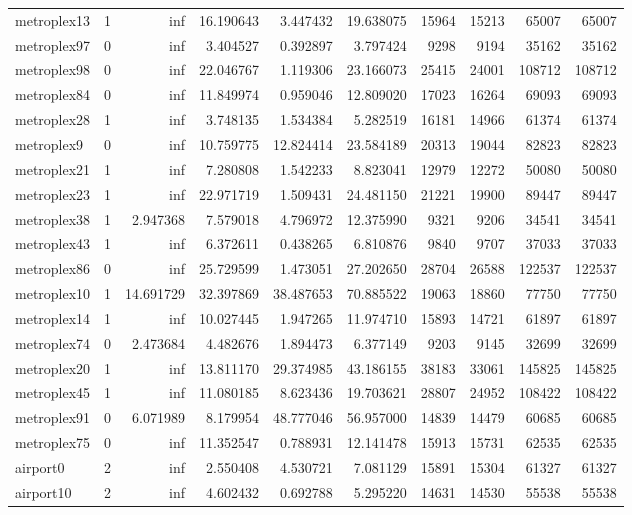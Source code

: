 \begin{longtable}{|l|r|r|r|r|r|r|r|r|r|}
metroplex13 & 1 & inf & 16.190643 & 3.447432 & 19.638075 & 15964 & 15213 & 65007 & 65007 \\
metroplex97 & 0 & inf & 3.404527 & 0.392897 & 3.797424 & 9298 & 9194 & 35162 & 35162 \\
metroplex98 & 0 & inf & 22.046767 & 1.119306 & 23.166073 & 25415 & 24001 & 108712 & 108712 \\
metroplex84 & 0 & inf & 11.849974 & 0.959046 & 12.809020 & 17023 & 16264 & 69093 & 69093 \\
metroplex28 & 1 & inf & 3.748135 & 1.534384 & 5.282519 & 16181 & 14966 & 61374 & 61374 \\
metroplex9 & 0 & inf & 10.759775 & 12.824414 & 23.584189 & 20313 & 19044 & 82823 & 82823 \\
metroplex21 & 1 & inf & 7.280808 & 1.542233 & 8.823041 & 12979 & 12272 & 50080 & 50080 \\
metroplex23 & 1 & inf & 22.971719 & 1.509431 & 24.481150 & 21221 & 19900 & 89447 & 89447 \\
metroplex38 & 1 & 2.947368 & 7.579018 & 4.796972 & 12.375990 & 9321 & 9206 & 34541 & 34541 \\
metroplex43 & 1 & inf & 6.372611 & 0.438265 & 6.810876 & 9840 & 9707 & 37033 & 37033 \\
metroplex86 & 0 & inf & 25.729599 & 1.473051 & 27.202650 & 28704 & 26588 & 122537 & 122537 \\
metroplex10 & 1 & 14.691729 & 32.397869 & 38.487653 & 70.885522 & 19063 & 18860 & 77750 & 77750 \\
metroplex14 & 1 & inf & 10.027445 & 1.947265 & 11.974710 & 15893 & 14721 & 61897 & 61897 \\
metroplex74 & 0 & 2.473684 & 4.482676 & 1.894473 & 6.377149 & 9203 & 9145 & 32699 & 32699 \\
metroplex20 & 1 & inf & 13.811170 & 29.374985 & 43.186155 & 38183 & 33061 & 145825 & 145825 \\
metroplex45 & 1 & inf & 11.080185 & 8.623436 & 19.703621 & 28807 & 24952 & 108422 & 108422 \\
metroplex91 & 0 & 6.071989 & 8.179954 & 48.777046 & 56.957000 & 14839 & 14479 & 60685 & 60685 \\
metroplex75 & 0 & inf & 11.352547 & 0.788931 & 12.141478 & 15913 & 15731 & 62535 & 62535 \\
airport0 & 2 & inf & 2.550408 & 4.530721 & 7.081129 & 15891 & 15304 & 61327 & 61327 \\
airport10 & 2 & inf & 4.602432 & 0.692788 & 5.295220 & 14631 & 14530 & 55538 & 55538 \\

\end{longtable}
